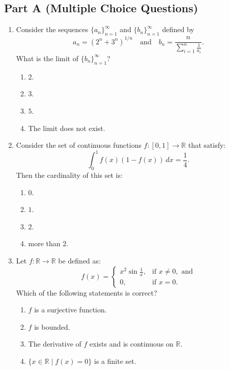 \documentclass[11pt, a4paper]{article}
\begin{document}
\subsection*{Part A (Multiple Choice Questions)}
\begin{enumerate}
  \item Consider the sequences $\{a_n\}_{n=1}^\infty$ and $\{b_n\}_{n=1}^\infty$ defined by
  \[
    a_n = (2^n + 3^n)^{1/n} \quad \text{and} \quad b_n = \frac{n}{\sum_{i=1}^n \frac{1}{a_i}}.
  \]
  What is the limit of $\{b_n\}_{n=1}^\infty$?
  \begin{enumerate}[label=(\alph*)]
    \item $2$.
    \item $3$.
    \item $5$.
    \item The limit does not exist.
  \end{enumerate}

  \item Consider the set of continuous functions $f: [0,1] \to \mathbb{R}$ that satisfy:
  \[
    \int_0^1 f(x)(1 - f(x))\,dx = \frac{1}{4}.
  \]
  Then the cardinality of this set is:
  \begin{enumerate}[label=(\alph*)]
    \item $0$.
    \item $1$.
    \item $2$.
    \item more than $2$.
  \end{enumerate}

  \item Let $f: \mathbb{R} \to \mathbb{R}$ be defined as:
  \[
    f(x) = \begin{cases}
      x^2 \sin\frac{1}{x}, & \text{if } x \ne 0, \text{ and} \\
      0, & \text{if } x = 0.
    \end{cases}
  \]
  Which of the following statements is correct?
  \begin{enumerate}[label=(\alph*)]
    \item $f$ is a surjective function.
    \item $f$ is bounded.
    \item The derivative of $f$ exists and is continuous on $\mathbb{R}$.
    \item $\{x \in \mathbb{R} \mid f(x) = 0\}$ is a finite set.
  \end{enumerate}


\end{enumerate}
\end{document}
